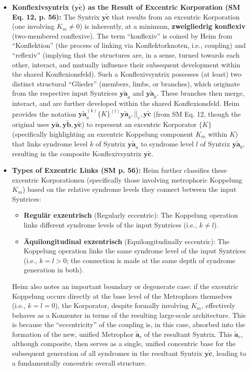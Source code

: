 \documentclass[12pt]{article}
\newcommand{\q}[1]{\enquote{#1}}
\newcommand{\syntrix}{\bm{y\widetilde{a}}}
\newcommand{\metrophor}{\bm{\widetilde{a}}}
\newcommand{\konflexivsyntrix}{\bm{y\widetilde{c}}}
\begin{document}
\begin{itemize}
\begin{itemize}
        \item \textbf{Konflexivsyntrix (\( \konflexivsyntrix \)) as the Result of Excentric Korporation (SM Eq. 12, p. 56):} The Syntrix \( \konflexivsyntrix \) that results from an excentric Korporation (one involving \(K_m \neq 0\)) is inherently, at a minimum, \textbf{zweigliedrig konflexiv} (two-membered conflexive). The term \q{konflexiv} is coined by Heim from \q{Konflektion} (the process of linking via Konflektorknoten, i.e., coupling) and \q{reflexiv} (implying that the structures are, in a sense, turned towards each other, interact, and mutually influence their subsequent development within the shared Konflexionsfeld). Such a Konflexivsyntrix possesses (at least) two distinct structural \q{Glieder} (members, limbs, or branches), which originate from the respective input Syntrices \( \syntrix_a \) and \( \syntrix_b \). These branches then merge, interact, and are further developed within the shared Konflexionsfeld. Heim provides the notation \( \syntrix_a^{(k)} \{K\}^{(l)} \syntrix_b, \overline{||}_c, \konflexivsyntrix \) (from SM Eq. 12, though the original uses \( \mathbf{y\widetilde{a}}, \mathbf{y\widetilde{b}}, \mathbf{y\widetilde{c}} \)) to represent an excentric Korporator \( \{K\} \) (specifically highlighting an excentric Koppelung component \(K_m\) within \(K\)) that links syndrome level \( k \) of Syntrix \( \syntrix_a \) to syndrome level \( l \) of Syntrix \( \syntrix_b \), resulting in the composite Konflexivsyntrix \( \konflexivsyntrix \).
        \item \textbf{Types of Exzentric Links (SM p. 56):} Heim further classifies these excentric Korporationen (specifically those involving metrophoric Koppelung \(K_m\)) based on the relative syndrome levels they connect between the input Syntrices:
        \begin{itemize}
            \item \textbf{Regulär exzentrisch} (Regularly eccentric): The Koppelung operation links different syndrome levels of the input Syntrices (i.e., \( k \neq l \)).
            \item \textbf{Äquilongitudinal exzentrisch} (Equilongitudinally eccentric): The Koppelung operation links the same syndrome level of the input Syntrices (i.e., \( k = l > 0 \); the connection is made at the same depth of syndrome generation in both).
        \end{itemize}
        Heim also notes an important boundary or degenerate case: if the excentric Koppelung occurs directly at the base level of the Metrophors themselves (i.e., \( k=l=0 \)), the Korporator, despite formally involving \(K_m\), effectively behaves as a Konzenter in terms of the resulting large-scale architecture. This is because the \q{eccentricity} of the coupling is, in this case, absorbed into the formation of the new, unified Metrophor \( \metrophor_c \) of the resultant Syntrix. This \( \metrophor_c \), although composite, then serves as a single, unified concentric base for the subsequent generation of all syndromes in the resultant Syntrix \( \konflexivsyntrix \), leading to a fundamentally concentric overall structure.
    \end{itemize}


\end{itemize}
\end{document}
